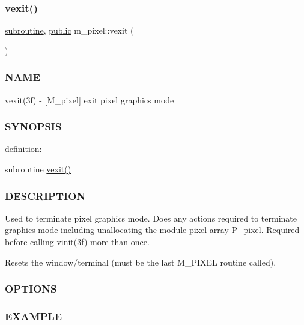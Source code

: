 \mbox{\label{namespacem__pixel_a19ad6b65752322b0029a62cc0ebec3e8}} 
\subsubsection{\texorpdfstring{vexit()}{vexit()}}
{\footnotesize\ttfamily \hyperlink{M__stopwatch_83_8txt_acfbcff50169d691ff02d4a123ed70482}{subroutine}, \hyperlink{M__stopwatch_83_8txt_a2f74811300c361e53b430611a7d1769f}{public} m\+\_\+pixel\+::vexit (\begin{DoxyParamCaption}{ }\end{DoxyParamCaption})}



\subsubsection*{N\+A\+ME}

vexit(3f) -\/ \mbox{[}M\+\_\+pixel\mbox{]} exit pixel graphics mode 

\subsubsection*{S\+Y\+N\+O\+P\+S\+IS}

definition\+:

subroutine \hyperlink{namespacem__pixel_a19ad6b65752322b0029a62cc0ebec3e8}{vexit()}

\subsubsection*{D\+E\+S\+C\+R\+I\+P\+T\+I\+ON}

Used to terminate pixel graphics mode. Does any actions required to terminate graphics mode including unallocating the module pixel array P\+\_\+pixel. Required before calling vinit(3f) more than once.

Resets the window/terminal (must be the last M\+\_\+\+P\+I\+X\+EL routine called).

\subsubsection*{O\+P\+T\+I\+O\+NS}

\subsubsection*{E\+X\+A\+M\+P\+LE}

